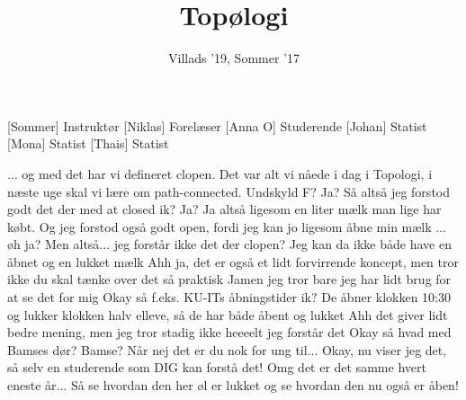 \documentclass[a4paper,11pt]{article}
\title{Topølogi}
\author{Villads '19, Sommer '17}
\begin{document}
\maketitle

\begin{roles}
[Sommer] Instruktør
[Niklas] Forelæser
[Anna O] Studerende
[Johan] Statist
[Mona] Statist
[Thais] Statist
\end{roles}

\begin{sketch}
 ... og med det har vi defineret clopen. Det var alt vi nåede i dag i Topologi, i næste uge skal vi lære om path-connected.
 Undskyld F? 
 Ja?
 Så altså jeg forstod godt det der med at closed ik?
 Ja?
 Ja altså ligesom en liter mælk man lige har købt. Og jeg forstod også godt open, fordi jeg kan jo ligesom åbne min mælk
  ... øh ja?
 Men altså... jeg forstår ikke det der clopen? Jeg kan da ikke både have en åbnet og en lukket mælk
 Ahh ja, det er også et lidt forvirrende koncept, men tror ikke du skal tænke over det så praktisk
 Jamen jeg tror bare jeg har lidt brug for at se det for mig
 Okay så f.eks. KU-ITs åbningstider ik? De åbner klokken 10:30 og lukker klokken halv elleve, så de har både åbent og lukket 
 Ahh det giver lidt bedre mening, men jeg tror stadig ikke heeeelt jeg forstår det
 Okay så hvad med Bamses dør?
 Bamse?
 Når nej det er du nok for ung til...
 Okay, nu viser jeg det, så selv en studerende som DIG kan forstå det!
 Omg det er det samme hvert eneste år... 
 Så se hvordan den her øl er lukket
 og se hvordan den nu også er åben!
\end{sketch}
\end{document}
